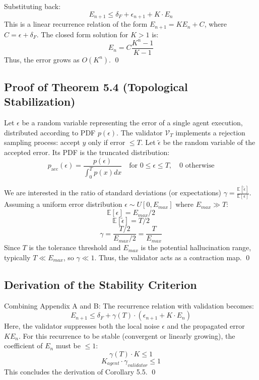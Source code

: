 \documentclass[11pt]{article}
\theoremstyle{definition}
\begin{document}
Substituting back:
$$ E_{n+1} \le \delta_F + \epsilon_{n+1} + K \cdot E_n $$
This is a linear recurrence relation of the form $E_{n+1} = K E_n + C$, where $C = \epsilon + \delta_F$.
The closed form solution for $K > 1$ is:
$$ E_n = C \frac{K^n - 1}{K - 1} $$
Thus, the error grows as $O(K^n)$. \qed

\subsection{Proof of Theorem 5.4 (Topological Stabilization)}
Let $\epsilon$ be a random variable representing the error of a single agent execution, distributed according to PDF $p(\epsilon)$.
The validator $\mathcal{V}_T$ implements a rejection sampling process: accept $y$ only if error $\le T$.
Let $\tilde{\epsilon}$ be the random variable of the accepted error. Its PDF is the truncated distribution:
$$ p_{\text{acc}}(\epsilon) = \frac{p(\epsilon)}{\int_0^T p(x) dx} \quad \text{for } 0 \le \epsilon \le T, \quad 0 \text{ otherwise} $$

We are interested in the ratio of standard deviations (or expectations) $\gamma = \frac{\mathbb{E}[\tilde{\epsilon}]}{\mathbb{E}[\epsilon]}$.
Assuming a uniform error distribution $\epsilon \sim U[0, E_{max}]$ where $E_{max} \gg T$:
$$ \mathbb{E}[\epsilon] = E_{max} / 2 $$
$$ \mathbb{E}[\tilde{\epsilon}] = T / 2 $$
$$ \gamma = \frac{T/2}{E_{max}/2} = \frac{T}{E_{max}} $$
Since $T$ is the tolerance threshold and $E_{max}$ is the potential hallucination range, typically $T \ll E_{max}$, so $\gamma \ll 1$. Thus, the validator acts as a contraction map. \qed

\subsection{Derivation of the Stability Criterion}
Combining Appendix A and B:
The recurrence relation with validation becomes:
$$ E_{n+1} \le \delta_F + \gamma(T) \cdot ( \epsilon_{n+1} + K \cdot E_n ) $$
Here, the validator suppresses both the local noise $\epsilon$ and the propagated error $K E_n$.
For this recurrence to be stable (convergent or linearly growing), the coefficient of $E_n$ must be $\le 1$:
$$ \gamma(T) \cdot K \le 1 $$
$$ K_{agent} \cdot \gamma_{validator} \le 1 $$
This concludes the derivation of Corollary 5.5. \qed
\end{document}
